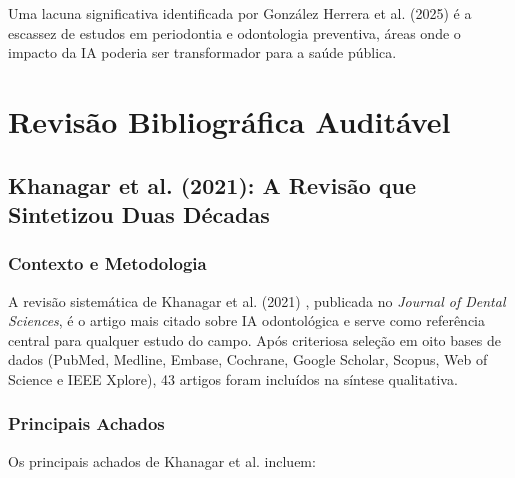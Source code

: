 Uma lacuna significativa identificada por González Herrera et al. (2025) é a escassez de estudos em periodontia e odontologia preventiva, áreas onde o impacto da IA poderia ser transformador para a saúde pública.

\section{Revisão Bibliográfica Auditável}

\subsection{Khanagar et al. (2021): A Revisão que Sintetizou Duas Décadas}

\subsubsection{Contexto e Metodologia}

A revisão sistemática de Khanagar et al. (2021) \cite{ODT-001}, publicada no \textit{Journal of Dental Sciences}, é o artigo mais citado sobre IA odontológica e serve como referência central para qualquer estudo do campo. Após criteriosa seleção em oito bases de dados (PubMed, Medline, Embase, Cochrane, Google Scholar, Scopus, Web of Science e IEEE Xplore), 43 artigos foram incluídos na síntese qualitativa.


\subsubsection{Principais Achados}

Os principais achados de Khanagar et al. incluem:

